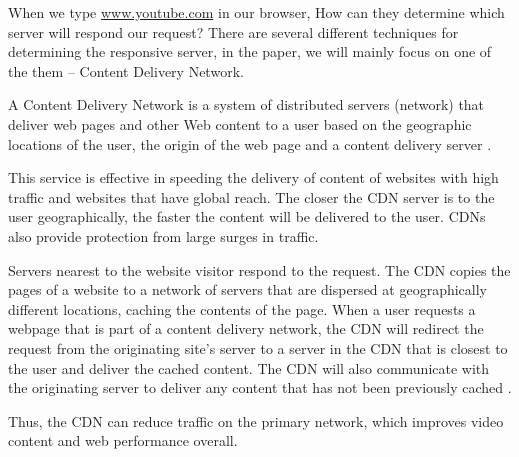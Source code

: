 When we type \url{www.youtube.com} in our browser, How can they determine which server will respond our request? There are several different techniques for determining the responsive server, in the paper, we will mainly focus on one of the them -- Content Delivery Network.

A Content Delivery Network is a system of distributed servers (network) that deliver web pages and other Web content to a user based on the geographic locations of the user, the origin of the web page and a content delivery server \cite{webopedia:cdn}.

This service is effective in speeding the delivery of content of websites with high traffic and websites that have global reach. The closer the CDN server is to the user geographically, the faster the content will be delivered to the user. CDNs also provide protection from large surges in traffic.

Servers nearest to the website visitor respond to the request. The CDN copies the pages of a website to a network of servers that are dispersed at geographically different locations, caching the contents of the page. When a user requests a webpage that is part of a content delivery network, the CDN will redirect the request from the originating site's server to a server in the CDN that is closest to the user and deliver the cached content. The CDN will also communicate with the originating server to deliver any content that has not been previously cached .

Thus, the CDN can reduce traffic on the primary network, which improves video content and web performance overall.
